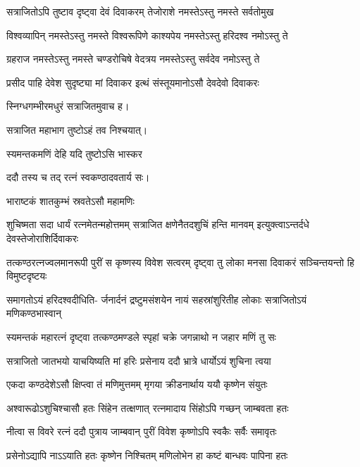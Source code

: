\twolineshloka
{सत्राजितोऽपि तुष्टाव दृष्ट्वा देवं दिवाकरम्}
{तेजोराशे नमस्तेऽस्तु नमस्ते सर्वतोमुख}%

\twolineshloka
{विश्वव्यापिन् नमस्तेऽस्तु नमस्ते विश्वरूपिणे}
{काश्यपेय नमस्तेऽस्तु हरिदश्व नमोऽस्तु ते}%

\twolineshloka
{ग्रहराज नमस्तेऽस्तु नमस्ते चण्डरोचिषे}
{वेदत्रय नमस्तेऽस्तु सर्वदेव नमोऽस्तु ते}%

\twolineshloka
{प्रसीद पाहि देवेश सुदृष्ट्या मां दिवाकर}
{इत्थं संस्तूयमानोऽसौ देवदेवो दिवाकरः}%

{स्निग्धगम्भीरमधुरं सत्राजितमुवाच ह।}



{सत्राजित महाभाग तुष्टोऽहं तव निश्चयात्।}


\onelineshloka
{स्यमन्तकमणिं देहि यदि तुष्टोऽसि भास्कर}%

{ददौ तस्य च तद् रत्नं स्वकण्ठादवतार्य सः।}

\onelineshloka
{भाराष्टकं शातकुम्भं स्रवतेऽसौ महामणिः}%

\threelineshloka
{शुचिष्मता सदा धार्यं रत्नमेतन्महोत्तमम्}
{सत्राजित क्षणेनैतदशुचिं हन्ति मानवम्}
{इत्युक्त्वाऽन्तर्दधे देवस्तेजोराशिर्दिवाकरः}%

\fourlineindentedshloka
{तत्कण्ठरत्नज्वलमानरूपी}
{पुरीं स कृष्णस्य विवेश सत्वरम्} 
{दृष्ट्वा तु लोका मनसा दिवाकरं}
{सञ्चिन्तयन्तो हि विमुष्टदृष्टयः}%

\fourlineindentedshloka
{समागतोऽयं हरिदश्वदीधिति-}
{र्जनार्दनं द्रष्टुमसंशयेन} 
{नायं सहस्रांशुरितीह लोकाः}
{सत्राजितोऽयं मणिकण्ठभास्वान्}%

\twolineshloka
{स्यमन्तकं महारत्नं दृष्ट्वा तत्कण्ठमण्डले}
{स्पृहां चक्रे जगन्नाथो न जहार मणिं तु सः}%

\twolineshloka
{सत्राजितो जातभयो याचयिष्यति मां हरिः}
{प्रसेनाय ददौ भ्रात्रे धार्योऽयं शुचिना त्वया}%

\twolineshloka
{एकदा कण्ठदेशेऽसौ क्षिप्त्वा तं मणिमुत्तमम्}
{मृगया क्रीडनार्थाय ययौ कृष्णेन संयुतः}%

\twolineshloka
{अश्वारूढोऽशुचिश्चासौ हतः सिंहेन तत्क्षणात्}
{रत्नमादाय सिंहोऽपि गच्छन् जाम्बवता हतः}%

\twolineshloka
{नीत्वा स विवरे रत्नं ददौ पुत्राय जाम्बवान्}
{पुरीं विवेश कृष्णोऽपि स्वकैः सर्वैः समावृतः}%

\twolineshloka
{प्रसेनोऽद्यापि नाऽऽयाति हतः कृष्णेन निश्चितम्}
{मणिलोभेन हा कष्टं बान्धवः पापिना हतः}%


